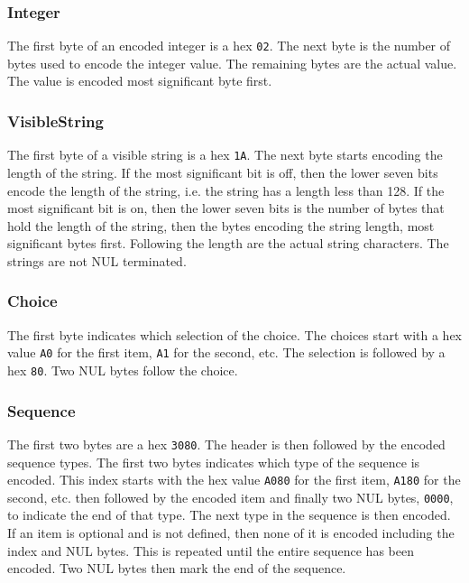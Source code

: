 \subsubsection{Integer}

The first byte of an encoded integer is a hex \verb+02+.  The next byte 
is the number of bytes used to encode the integer value.  The 
remaining bytes are the actual value.  The value is encoded 
most significant byte first.

\subsubsection{VisibleString}

The first byte of a visible string is a hex \verb+1A+.  
The next byte 
starts encoding the length of the string.  If the most 
significant bit is off, then the lower seven bits encode the 
length of the string, i.e. the string has a length less than 128. 
If the most significant bit is on, then 
the lower seven bits is the number of bytes that hold the length of 
the string, then the bytes encoding the string length, most significant 
bytes first.
Following the length are the actual string characters.
The strings are not NUL terminated.  

\subsubsection{Choice}


The first byte indicates which selection of the choice.  The choices 
start with a hex value \verb+A0+ for the first item, \verb+A1+ for 
the second, etc.  
The selection is followed by a hex \verb+80+.  Two NUL bytes follow 
the choice.

\subsubsection{Sequence}

The first two bytes are a hex \verb+3080+.  The header is 
then followed by 
the encoded sequence types.  The first two bytes indicates which type 
of the sequence is encoded.  This index starts with the hex value 
\verb+A080+ 
for the first item, \verb+A180+ for the second, etc. then 
followed by the 
encoded item and finally two NUL bytes, \verb+0000+, to indicate the end 
of that type.  The next type in the sequence is then encoded.  If an 
item is optional and is not defined, then none of it is encoded 
including the index and NUL bytes.  This is repeated until the entire 
sequence has been encoded.  Two NUL bytes then mark the end of the 
sequence.


